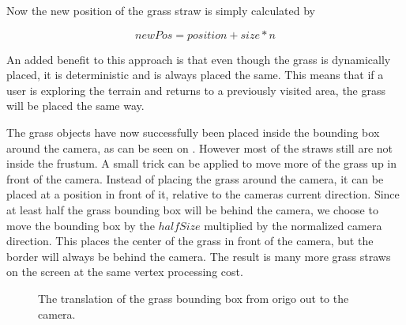 Now the new position of the grass straw is simply calculated by 

\begin{displaymath}
  newPos = position + size * n
\end{displaymath}

An added benefit to this approach is that even though the grass is
dynamically placed, it is deterministic and is always placed the
same. This means that if a user is exploring the terrain and returns
to a previously visited area, the grass will be placed the same way.


The grass objects have now successfully been placed inside the bounding
box around the camera, as can be seen on
. However most of the straws still are
not inside the frustum. A small trick can be applied to move more of
the grass up in front of the camera. Instead of placing the grass
around the camera, it can be placed at a position in front of it,
relative to the cameras current direction. Since at least half the
grass bounding box will be behind the camera, we choose to move the
bounding box by the $halfSize$ multiplied by the normalized camera
direction. This places the center of the grass in front of the camera,
but the border will always be behind the camera. The result is many
more grass straws on the screen at the same vertex processing cost.

\begin{figure}
  \centering
  \caption{The translation of the grass bounding box from origo out to the camera.}
  \label{fig:grassTranslation}
\end{figure}


